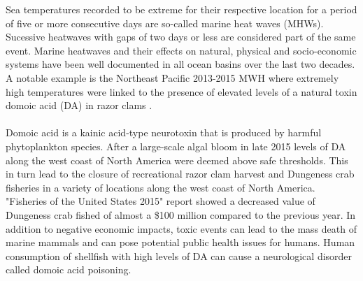 Sea temperatures recorded to be extreme for their respective location for a period of five or more consecutive days are so-called marine heat waves (MHWs). Sucessive heatwaves with gaps of two days or less are considered part of the same event. \cite{MWHdef} Marine heatwaves and their effects on natural, physical and socio-economic systems have been well documented in all ocean basins over the last two decades. A notable example is the Northeast Pacific 2013-2015 MWH where extremely high temperatures were linked to the presence of elevated levels of a natural toxin domoic acid (DA) in razor clams \cite{toxinheat}. 
\\\\
Domoic acid is a kainic acid-type neurotoxin that is produced by harmful phytoplankton species. After a large-scale algal bloom in late 2015 levels of DA along the west coast of North America were deemed above safe thresholds. This in turn lead to the closure of recreational razor clam harvest and Dungeness crab fisheries in a variety of locations along the west coast of North America. "Fisheries of the United States 2015" report showed a decreased value of Dungeness crab fished of almost a \$100 million compared to the previous year. \cite{2015Cost} In addition to negative economic impacts, toxic events can lead to the mass death of marine mammals and can pose potential public health issues for humans. Human consumption of shellfish with high levels of DA can cause a neurological disorder called domoic acid poisoning. 


